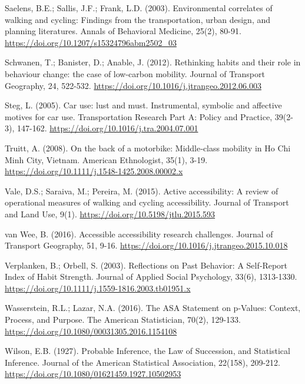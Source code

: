\documentclass[
  11pt,
  a4paper,
]{article}
\begin{document}
Saelens, B.E.; Sallis, J.F.; Frank, L.D. (2003). Environmental
correlates of walking and cycling: Findings from the transportation,
urban design, and planning literatures. Annals of Behavioral Medicine,
25(2), 80-91. \url{https://doi.org/10.1207/s15324796abm2502_03}

Schwanen, T.; Banister, D.; Anable, J. (2012). Rethinking habits and
their role in behaviour change: the case of low-carbon mobility. Journal
of Transport Geography, 24, 522-532.
\url{https://doi.org/10.1016/j.jtrangeo.2012.06.003}

Steg, L. (2005). Car use: lust and must. Instrumental, symbolic and
affective motives for car use. Transportation Research Part A: Policy
and Practice, 39(2-3), 147-162.
\url{https://doi.org/10.1016/j.tra.2004.07.001}

Truitt, A. (2008). On the back of a motorbike: Middle‐class mobility in
Ho Chi Minh City, Vietnam. American Ethnologist, 35(1), 3-19.
\url{https://doi.org/10.1111/j.1548-1425.2008.00002.x}

Vale, D.S.; Saraiva, M.; Pereira, M. (2015). Active accessibility: A
review of operational measures of walking and cycling accessibility.
Journal of Transport and Land Use, 9(1).
\url{https://doi.org/10.5198/jtlu.2015.593}

van Wee, B. (2016). Accessible accessibility research challenges.
Journal of Transport Geography, 51, 9-16.
\url{https://doi.org/10.1016/j.jtrangeo.2015.10.018}

Verplanken, B.; Orbell, S. (2003). Reflections on Past Behavior: A
Self‐Report Index of Habit Strength. Journal of Applied Social
Psychology, 33(6), 1313-1330.
\url{https://doi.org/10.1111/j.1559-1816.2003.tb01951.x}

Wasserstein, R.L.; Lazar, N.A. (2016). The ASA Statement on p-Values:
Context, Process, and Purpose. The American Statistician, 70(2),
129-133. \url{https://doi.org/10.1080/00031305.2016.1154108}

Wilson, E.B. (1927). Probable Inference, the Law of Succession, and
Statistical Inference. Journal of the American Statistical Association,
22(158), 209-212. \url{https://doi.org/10.1080/01621459.1927.10502953}
\end{document}

